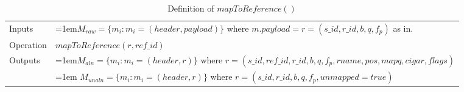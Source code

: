 \documentclass[12pt, twoside]{report}
\begin{document}
\bgroup
\def\arraystretch{1.5}
\begin{table}[!ht]
    \caption{Definition of $mapToReference()$}
    \label{tab:op_map_read_to_reference}
    {\begin{tabular}{l|p{12cm}}
    \toprule
    Inputs & \hangindent=1em$M_{raw} = \{m_i: m_i = (header, payload)\}$ where $m.payload = r = (s\_id, r\_id, b, q, f_p)$ as in. \\
    \cline{2-2}
    Operation & $mapToReference(r, ref\_id)$\\
    \cline{2-2}
    \multirow{2}{*}{Outputs} & \hangindent=1em$M_{aln} = \{m_i: m_i = (header, r)\} \text{ where } r = (s\_id, ref\_id, r\_id, b, q, f_p, rname, pos, mapq, cigar, flags)$\\
    & \hangindent=1em $M_{unaln} = \{m_i: m_i = (header, r)\} \text{  where } r = (s\_id, r\_id, b, q, f_p, unmapped=true)$\\
    \bottomrule
    \end{tabular}}
\end{table}
\egroup
\end{document}
